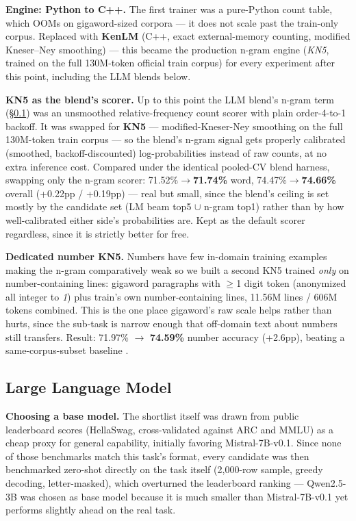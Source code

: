 \documentclass[11pt,conference]{IEEEtran}
\newcommand{\code}[1]{\textit{#1}}
\begin{document}
\textbf{Engine: Python to C++.} The first trainer was a pure-Python count
table, which OOMs on gigaword-sized corpora --- it does not scale past the
train-only corpus. Replaced with
\textbf{KenLM} (C++, exact external-memory counting, modified Kneser--Ney
smoothing) --- this became the production n-gram engine (\code{KN5}, trained
on the full 130M-token official train corpus) for every experiment after
this point, including the LLM blends below.

\textbf{KN5 as the blend's scorer.} Up to this point the LLM blend's n-gram
term (\S\ref{sec:llm}) was an unsmoothed relative-frequency count scorer with
plain order-4-to-1 backoff. It was swapped for \textbf{KN5} --- modified-Kneser-Ney smoothing on the full
130M-token train corpus --- so the blend's n-gram signal gets properly
calibrated (smoothed, backoff-discounted) log-probabilities instead of raw
counts, at no extra inference cost.
Compared under the identical pooled-CV blend harness, swapping only the
n-gram scorer: 71.52\%$\to$\textbf{71.74\%} word, 74.47\%$\to$\textbf{74.66\%}
overall (+0.22pp / +0.19pp) --- real but small, since the blend's ceiling is
set mostly by the candidate set (LM beam top5 $\cup$ n-gram top1) rather than
by how well-calibrated either side's probabilities are. Kept as the default
scorer regardless, since it is strictly better for free.

\textbf{Dedicated number KN5.}
\label{sec:kn5number}
Numbers have few in-domain training examples making the n-gram comparatively weak so we built a second KN5 trained
\emph{only} on number-containing lines: gigaword paragraphs with $\geq$1 digit
token (anonymized all integer to \code{1}) plus
train's own number-containing lines, 11.56M lines / 606M tokens combined.
This is the one place gigaword's raw scale helps rather than hurts, since the
sub-task is narrow enough that off-domain text about numbers still transfers.
Result: 71.97\% $\rightarrow$ \textbf{74.59\%} number accuracy (+2.6pp),
beating a same-corpus-subset baseline .

\subsection{Large Language Model}
\label{sec:llm}

\textbf{Choosing a base model.} The shortlist itself was drawn from public
leaderboard scores (HellaSwag, cross-validated against ARC and MMLU) as a
cheap proxy for general capability, initially favoring Mistral-7B-v0.1. Since
none of those benchmarks match this task's format, every candidate was
then benchmarked zero-shot directly on the task itself (2,000-row sample,
greedy decoding, letter-masked), which overturned the leaderboard ranking ---
Qwen2.5-3B was chosen as base model because it is much smaller than
Mistral-7B-v0.1 yet performs slightly ahead on the real task.
\end{document}
